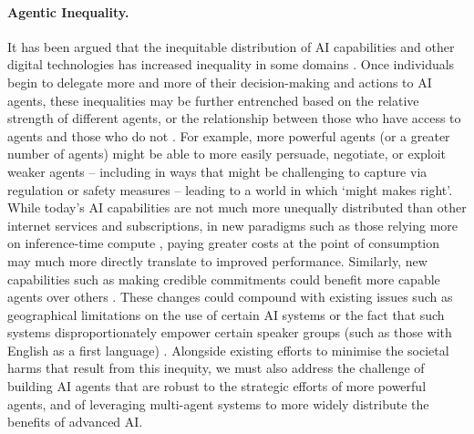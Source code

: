 \paragraph{Agentic Inequality.}
It has been argued that the inequitable distribution of AI capabilities and other digital technologies has increased inequality in some domains \citep{Mirza2019,Vassilakopoulou2021}.
Once individuals begin to delegate more and more of their decision-making and actions to AI agents, these inequalities may be further entrenched based on the relative strength of different agents, or the relationship between those who have access to agents and those who do not \citep{Gabriel2024}.
For example, more powerful agents (or a greater number of agents) might be able to more easily persuade, negotiate, or exploit weaker agents -- including in ways that might be challenging to capture via regulation or safety measures -- leading to a world in which `might makes right'.
While today's AI capabilities are not much more unequally distributed than other internet services and subscriptions, in new paradigms such as those relying more on inference-time compute \citep{Snell2024,OpenAI2024a}, paying greater costs at the point of consumption may much more directly translate to improved performance.
Similarly, new capabilities such as making credible commitments could benefit more capable agents over others \citep{Stengel2010,Letchford2013}.
These changes could compound with existing issues such as geographical limitations on the use of certain AI systems or the fact that such systems disproportionately empower certain speaker groups (such as those with English as a first language) \citep{Chan2021}.
Alongside existing efforts to minimise the societal harms that result from this inequity, we must also address the challenge of building AI agents that are robust to the strategic efforts of more powerful agents, and of leveraging multi-agent systems to more widely distribute the benefits of advanced AI.


